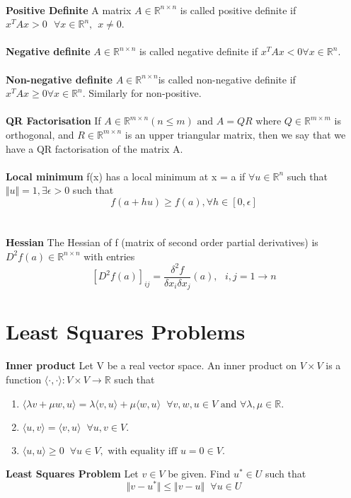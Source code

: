 \documentclass{article}
\begin{document}
\\
\textbf{Positive Definite} A matrix $A \in \mathbb{R}^{n \times n}$ is called positive definite if $x^TAx > 0 \hspace{8pt}\forall x \in \mathbb{R}^n, \hspace{5pt} x \ne 0$.
\\
\\
\textbf{Negative definite}
$A \in \mathbb{R}^{n \times n}$ is called negative definite if $x^TAx <0 \forall x \in \mathbb{R}^n$.
\\
\\
\textbf{Non-negative definite}
$A \in \mathbb{R}^{n \times n} $is called non-negative definite if $x^T Ax \geq 0 \forall x \in \mathbb{R}^n$. Similarly for non-positive.
\\
\\
\textbf{QR Factorisation} If $A \in \mathbb{R}^{m \times n} (n \leq m) \text{ and } A = QR \text{ where } Q \in \mathbb{R}^{m \times m}$ is orthogonal, and $R \in \mathbb{R}^{m \times n}$ is an upper triangular matrix, then we say that we have a QR factorisation of the matrix A.
\\
\\
\textbf{Local minimum}
f(x) has a local minimum at x = a if $\forall u \in \mathbb{R}^n$ such that $ \Vert u \Vert = 1, \exists \epsilon > 0$ such that
$$f(a+hu) \geq f(a), \forall h \in [0,\epsilon]$$
\\
\\
\textbf{Hessian}
The Hessian of f (matrix of second order partial derivatives) is $D^2f(a) \in \mathbb{R}^{n \times n} $ with entries
$$[D^2f(a)]_{ij} = \frac{\delta^2f}{\delta x_i \delta x_j}(a),\hspace{8pt} i,j=1 \to n $$

\section{Least Squares Problems}
\textbf{Inner product} Let V be a real vector space. An inner product on $V \times V$ is a function $\langle \cdot , \cdot \rangle:V \times V \to \mathbb{R}$ such that
\renewcommand{\theenumi}{\roman{enumi}}
\begin{enumerate}
    \item $\langle \lambda v+\mu w,u \rangle = \lambda \langle v,u \rangle + \mu \langle w,u \rangle \hspace{7pt} \forall v,w,u \in V \text{ and } \forall \lambda, \mu \in \mathbb{R}.$
    \item $\langle u,v \rangle =\langle v,u \rangle \hspace{7pt} \forall u,v \in V.$
    \item $\langle u,u \rangle  \geq 0 \hspace{7pt} \forall u \in V, \text{ with equality iff } u=0 \in V.$
\end{enumerate}
\textbf{Least Squares Problem}
 Let $v \in V$ be given. Find $u^{*} \in U$ such that
$$ \Vert v - u^{*} \Vert \leq \Vert v - u \Vert \hspace{7pt} \forall u \in U$$
\end{document}
